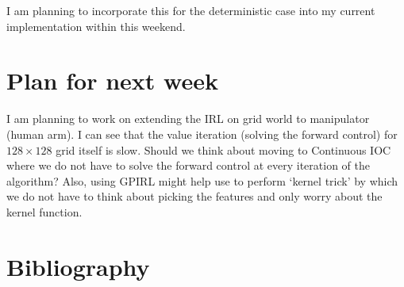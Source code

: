 \documentclass{article}[11pt]
\begin{document}
I am planning to incorporate this for the deterministic case into my current implementation within this weekend. 

\section{Plan for next week}
I am planning to work on extending the IRL on grid world to manipulator (human arm). I can see that the value iteration (solving the forward control) for $128\times 128$ grid itself is slow. Should we think about moving to Continuous IOC \cite{levine2012continuous} where we do not have to solve the forward control at every iteration of the algorithm?  Also, using GPIRL\cite{levine2011nonlinear} might help use to perform `kernel trick' by which we do not have to think about picking the features and only worry about the kernel function. 


\section{Bibliography}



\end{document}

